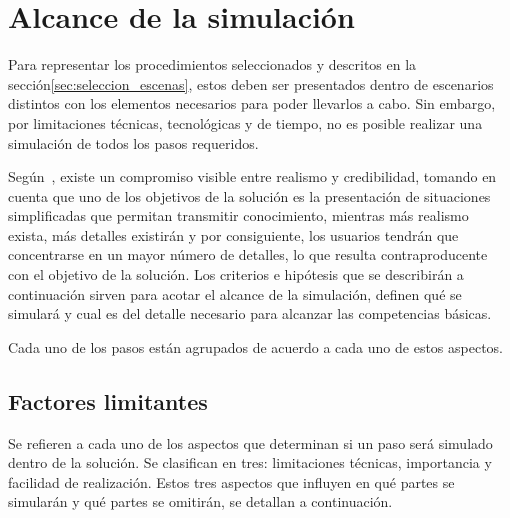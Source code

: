 \section{Alcance de la simulación}
\label{sec:alcance}


Para representar los procedimientos seleccionados y descritos en la
sección\ref{sec:seleccion_escenas}, estos deben ser presentados dentro de
escenarios distintos con los elementos necesarios para poder llevarlos a cabo.
Sin embargo, por limitaciones técnicas, tecnológicas y de tiempo, no es posible
realizar una simulación de todos los pasos requeridos.

Según~\cite{videojuegos:gonzaleztardon}, existe un compromiso visible entre
realismo y credibilidad, tomando en cuenta que uno de los objetivos de la
solución es la presentación de situaciones simplificadas que permitan transmitir
conocimiento, mientras más realismo exista, más detalles existirán y por
consiguiente, los usuarios tendrán que concentrarse en un mayor número de
detalles, lo que resulta contraproducente con el objetivo de la
solución\cite{videojuegos:gonzaleztardon}. Los criterios e hipótesis que se 
describirán a continuación sirven para acotar el
alcance de la simulación, definen qué se simulará y cual es del detalle
necesario para alcanzar las competencias básicas.


Cada uno de los pasos están agrupados de acuerdo a cada uno de estos aspectos.

\subsection{Factores limitantes}

Se refieren a cada uno de los aspectos que determinan si un paso 
será simulado dentro de la solución. Se clasifican en tres: limitaciones técnicas, 
importancia y facilidad de realización. Estos tres aspectos que influyen en qué partes 
se simularán y qué partes se omitirán, se detallan a continuación.

